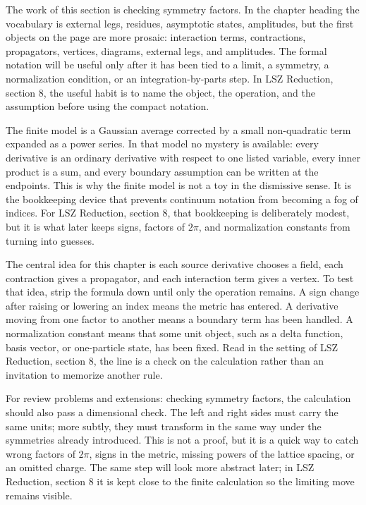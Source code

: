The work of this section is checking symmetry factors.  In the chapter heading the vocabulary is external legs, residues, asymptotic states, amplitudes, but the first objects on the page are more prosaic: interaction terms, contractions, propagators, vertices, diagrams, external legs, and amplitudes.  The formal notation will be useful only after it has been tied to a limit, a symmetry, a normalization condition, or an integration-by-parts step.  In LSZ Reduction, section 8, the useful habit is to name the object, the operation, and the assumption before using the compact notation.

The finite model is a Gaussian average corrected by a small non-quadratic term expanded as a power series.  In that model no mystery is available: every derivative is an ordinary derivative with respect to one listed variable, every inner product is a sum, and every boundary assumption can be written at the endpoints.  This is why the finite model is not a toy in the dismissive sense.  It is the bookkeeping device that prevents continuum notation from becoming a fog of indices.  For LSZ Reduction, section 8, that bookkeeping is deliberately modest, but it is what later keeps signs, factors of \(2\pi\), and normalization constants from turning into guesses.

The central idea for this chapter is each source derivative chooses a field, each contraction gives a propagator, and each interaction term gives a vertex.  To test that idea, strip the formula down until only the operation remains.  A sign change after raising or lowering an index means the metric has entered.  A derivative moving from one factor to another means a boundary term has been handled.  A normalization constant means that some unit object, such as a delta function, basis vector, or one-particle state, has been fixed.  Read in the setting of LSZ Reduction, section 8, the line is a check on the calculation rather than an invitation to memorize another rule.

For review problems and extensions: checking symmetry factors, the calculation should also pass a dimensional check.  The left and right sides must carry the same units; more subtly, they must transform in the same way under the symmetries already introduced.  This is not a proof, but it is a quick way to catch wrong factors of \(2\pi\), signs in the metric, missing powers of the lattice spacing, or an omitted charge.  The same step will look more abstract later; in LSZ Reduction, section 8 it is kept close to the finite calculation so the limiting move remains visible.

